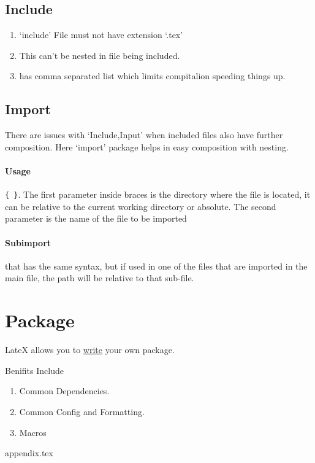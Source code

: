 \documentclass{report}[a4paper,12pt] %
\begin{document}
\subsection{Include}
\begin{enumerate}
  \item `include' File must not have extension `.tex'
  \item This can't be nested in file being included.
  \item \verb|| has comma separated list which limits compitalion speeding things up.
\end{enumerate}

\subsection{Import}
There are issues with `Include,Input' when included files also have further composition. Here `import' package helps in easy composition with nesting. 

\paragraph{Usage} \verb|{ }|. The first parameter inside braces is the directory where the file is located, it can be relative to the current working directory or absolute. The second parameter is the name of the file to be imported

\paragraph{Subimport} \verb|| that has the same syntax, but if used in one of the files that are imported in the main file, the path will be relative to that sub-file.

\section{Package}
LateX allows you to \href{https://www.overleaf.com/learn/latex/Writing_your_own_package}{write} your own package.

Benifits Include
\begin{enumerate}
  \item Common Dependencies.
  \item Common Config and Formatting.
  \item Macros
\end{enumerate}

{appendix.tex}
\end{document}
